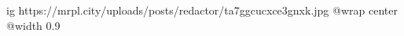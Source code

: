  
 
 
 
 

\ifcmt
  ig https://mrpl.city/uploads/posts/redactor/ta7ggcucxce3gnxk.jpg
  @wrap center
  @width 0.9
\fi
